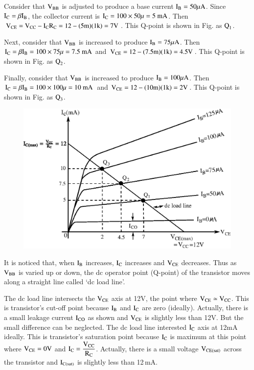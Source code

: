 Consider that $\textrm{V}_{\textrm{B}\textrm{B}}$ is adjusted to produce a base current $\textrm{I}_{\textrm{B}}=50\mu\textrm{A}$. Since $\textrm{I}_{\textrm{C}}=\beta \textrm{I}_{\textrm{B}}$, the collector current is $\textrm{I}_{\textrm{C}}=100\times 50\mu = 5\text{~mA}$. Then $\textrm{V}_{\textrm{C}\textrm{E}}=\textrm{V}_{\textrm{C}\textrm{C}}-\textrm{I}_{\textrm{C}}\textrm{R}_{\textrm{C}}=12-(5\textrm{m})(1\textrm{k})=7\textrm{V}$. This Q-point is shown in Fig. as $\textrm{Q}_{1}$.

Next, consider that $\textrm{V}_{\textrm{B}\textrm{B}}$ is increased to produce $\textrm{I}_{\textrm{B}}=75\mu\textrm{A}$. Then $\textrm{I}_{\textrm{C}}=\beta\textrm{I}_{\textrm{B}}=100\times 75\mu=7.5\text{~mA}$ and $\textrm{V}_{\text{CE}}=12-(7.5\textrm{m})(1\textrm{k})=4.5\textrm{V}$. This Q-point is shown in Fig. as $\textrm{Q}_{2}$. 

Finally, consider that $\textrm{V}_{\textrm{B}\textrm{B}}$ is increased to produce $\textrm{I}_{\textrm{B}}=100\mu\textrm{A}$. Then $\textrm{I}_{\textrm{C}}=\beta\textrm{I}_{\textrm{B}}=100\times 100\mu=10\text{~mA}$ and $\textrm{V}_{\text{CE}}=12-(10\textrm{m})(1\textrm{k})=2\textrm{V}$. This Q-point is shown in Fig. as $\textrm{Q}_{3}$.
\begin{figure}[H]
\centering
\includegraphics[scale=.9]{chap3/fig3.2.eps}
\end{figure}

It is noticed that, when $\textrm{I}_{\textrm{B}}$ increases, $\textrm{I}_{\textrm{C}}$ increases and $\textrm{V}_{\textrm{C}\textrm{E}}$ decreases. Thus as $\textrm{V}_{\textrm{B}\textrm{B}}$ is varied up or down, the dc operator point (Q-point) of the transistor moves along a straight line called `dc load line'.

The dc load line intersects the $\textrm{V}_{\text{CE}}$ axis at 12V, the point where $\textrm{V}_{\text{CE}}\simeq \textrm{V}_{\text{CC}}$. This is transistor's cut-off point because $\textrm{I}_{\textrm{B}}$ and $\textrm{I}_{\textrm{C}}$ are zero (ideally). Actually, there is a small leakage current $\textrm{I}_{\text{CO}}$ as shown and $\textrm{V}_{\text{CE}}$ is slightly less than 12V. But the small difference can be neglected. The dc load line interested $\textrm{I}_{\textrm{C}}$ axis at 12mA ideally. This is transistor's saturation point because $\textrm{I}_{\textrm{C}}$ is maximum at this point where $\textrm{V}_{\text{CE}}=0\textrm{V}$ and $\textrm{I}_{\textrm{C}}=\dfrac{\textrm{V}_{\text{CC}}}{\textrm{R}_{\textrm{C}}}$. Actually, there is a small voltage $\textrm{V}_{\text{CE(sat)}}$ across the transistor and $\textrm{I}_{\textrm{C}\text{(sat)}}$ is slightly less than 12\,mA.

